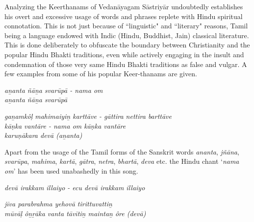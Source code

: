 \newpage

Analyzing the Keerthanams of Vedanāyagam Sāstriyār undoubtedly establishes his overt and excessive usage of words and phrases replete with Hindu spiritual connotation. This is not just because of ``linguistic" and ``literary" reasons, Tamil being a language endowed with Indic (Hindu, Buddhist, Jain) classical literature. This is done deliberately to obfuscate the boundary between Christianity and the popular Hindu Bhakti traditions, even while actively engaging in the insult and condemnation of those very same Hindu Bhakti traditions as false and vulgar. A few examples from some of his popular Keer-\break thanams are given.

\begin{centerquote}
\textit{aṉanta ñāṉa svarūpā - nama om\\ aṉanta ñāṉa svarūpā}
\end{centerquote}

\begin{centerquote}
\textit{gaṉamkôḷ mahimaiyiṉ karttāve - gāttira nettira barttāve \\ kāṇka vantāre - nama om kāṇka vantāre\\ karuṇākara devā (aṉanta) }
\end{centerquote}

\begin{myquote}
\end{myquote}

\begin{myquote}
\end{myquote}

Apart from the usage of the Tamil forms of the Sanskrit words \textit{ananta}, \textit{jñāna}, \textit{svarūpa}, \textit{mahima}, \textit{kartā}, \textit{gātra}, \textit{netra}, \textit{bhartā}, \textit{deva} etc. the Hindu chant `\textit{nama om}' has been used unabashedly in this song.

\begin{centerquote}
\textit{devā irakkam illaiyo - ecu devā irakkam illaiyo}
\end{centerquote}

\begin{centerquote}
\textit{jīva parabrahma yehovā tirittuvattiṉ \\ mūvāḷ ôṉṟāka vanta tāvītiṉ maintaṉ ôre (devā)}
\end{centerquote}

